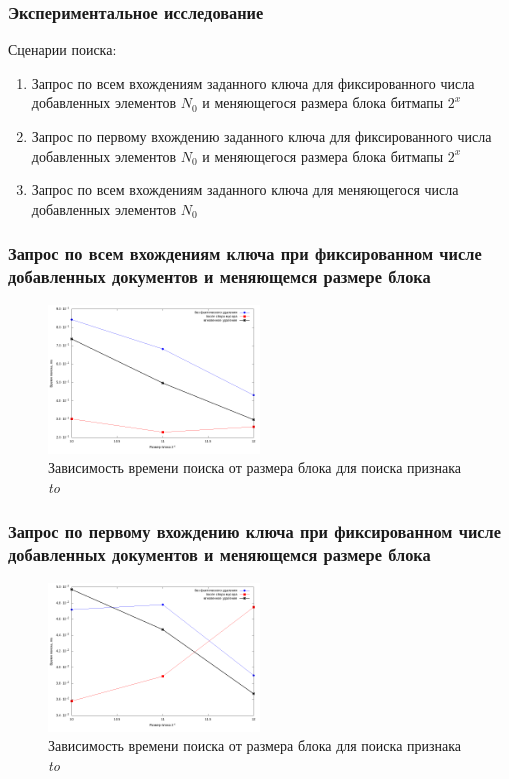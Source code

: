 \documentclass[aspectratio=169, pdf, 8pt, unicode]{beamer}
\begin{document}
\begin{frame}[fragile]
    \frametitle{Экспериментальное исследование}
{\large Сценарии поиска:}
    \vspace{4mm}
\begin{enumerate}
    \item Запрос по всем вхождениям заданного ключа для фиксированного числа
    добавленных элементов $N_0$ и меняющегося размера блока битмапы $2^{x}$
    \vspace{4mm}
    \item Запрос по первому вхождению заданного ключа для фиксированного числа
    добавленных элементов $N_0$ и меняющегося размера блока битмапы $2^{x}$
    \vspace{4mm}
    \item Запрос по всем вхождениям заданного ключа для меняющегося числа добавленных
    элементов $N_0$
\end{enumerate}
\end{frame}

\begin{frame}[fragile]
\frametitle{Запрос по всем вхождениям ключа при фиксированном числе добавленных
документов и меняющемся размере блока}
\begin{figure}[H]
\centering
\includegraphics[width=0.5\textwidth]{fig/limit_1e6/1e5/to.png}
\caption{Зависимость времени поиска от размера блока для поиска признака
\textit{to}}
\end{figure}
\end{frame}

\begin{frame}[fragile]
\frametitle{Запрос по первому вхождению ключа при фиксированном числе
добавленных документов и меняющемся размере блока}
\begin{figure}[H]
\centering
\includegraphics[width=0.5\textwidth]{fig/limit_1/1e5/to.png}
\caption{Зависимость времени поиска от размера блока для поиска признака \textit{to}}
\end{figure}
\end{frame}
\end{document}

